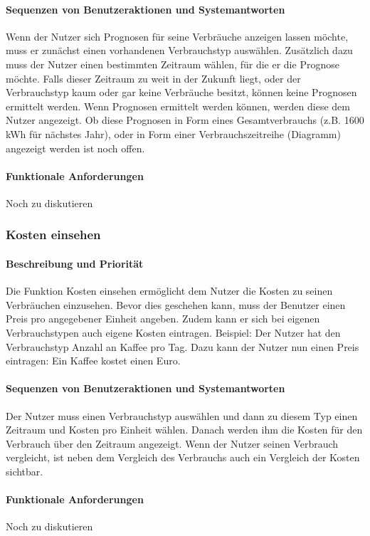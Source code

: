 \paragraph{Sequenzen von Benutzeraktionen und Systemantworten}
Wenn der Nutzer sich Prognosen für seine Verbräuche anzeigen lassen möchte, muss er zunächst einen vorhandenen Verbrauchstyp auswählen. Zusätzlich dazu muss der Nutzer einen bestimmten Zeitraum wählen, für die er die Prognose möchte. Falls dieser Zeitraum zu weit in der Zukunft liegt, oder der Verbrauchstyp kaum oder gar keine Verbräuche besitzt, können keine Prognosen ermittelt werden. Wenn Prognosen ermittelt werden können, werden diese dem Nutzer angezeigt. Ob diese Prognosen in Form eines Gesamtverbrauchs (z.B. 1600 kWh für nächstes Jahr), oder in Form einer Verbrauchszeitreihe (Diagramm) angezeigt werden ist noch offen.
\paragraph{Funktionale Anforderungen}
Noch zu diskutieren

\subsubsection{Kosten einsehen}
\paragraph{Beschreibung und Priorität}
Die Funktion Kosten einsehen ermöglicht dem Nutzer die Kosten zu seinen Verbräuchen einzusehen. Bevor dies geschehen kann, muss der Benutzer einen Preis pro angegebener Einheit angeben. Zudem kann er sich bei eigenen Verbrauchstypen auch eigene Kosten eintragen. Beispiel: Der Nutzer hat den Verbrauchstyp Anzahl an Kaffee pro Tag. Dazu kann der Nutzer nun einen Preis eintragen: Ein Kaffee kostet einen Euro.
\paragraph{Sequenzen von Benutzeraktionen und Systemantworten}
Der Nutzer muss einen Verbrauchstyp auswählen und dann zu diesem Typ einen Zeitraum und Kosten pro Einheit wählen. Danach werden ihm die Kosten für den Verbrauch über den Zeitraum angezeigt. Wenn der Nutzer seinen Verbrauch vergleicht, ist neben dem Vergleich des Verbrauchs auch ein Vergleich der Kosten sichtbar.
\paragraph{Funktionale Anforderungen}
Noch zu diskutieren

